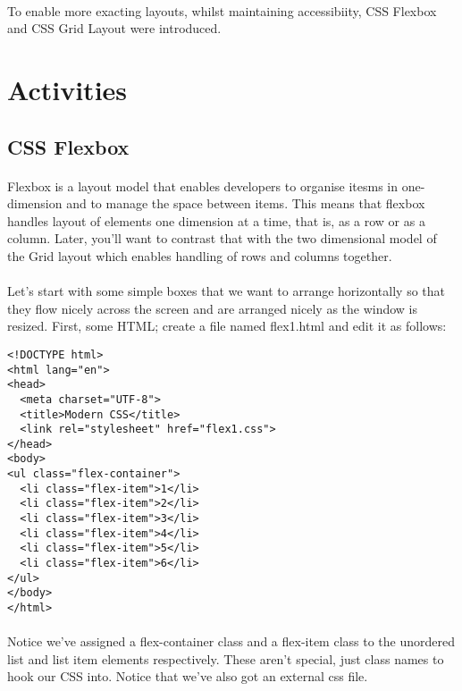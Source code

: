 \documentclass[10pt, a4paper]{article}
\begin{document}
\paragraph{} To enable more exacting layouts, whilst maintaining accessibiity, CSS Flexbox and CSS Grid Layout were introduced. 

\section*{Activities}

\subsection*{CSS Flexbox}
\paragraph{} Flexbox is a layout model that enables developers to organise itesms in one-dimension and to manage the space between items. This means that flexbox handles layout of elements one dimension at a time, that is, as a row or as a column. Later, you'll want to contrast that with the two dimensional model of the Grid layout which enables handling of rows and columns together.

\paragraph{} Let's start with some simple boxes that we want to arrange horizontally so that they flow nicely across the screen and are arranged nicely as the window is resized. First, some HTML; create a file named flex1.html and edit it as follows:

\begin{lstlisting}
<!DOCTYPE html>
<html lang="en">
<head>
  <meta charset="UTF-8">
  <title>Modern CSS</title>
  <link rel="stylesheet" href="flex1.css">
</head>
<body>
<ul class="flex-container">
  <li class="flex-item">1</li>
  <li class="flex-item">2</li>
  <li class="flex-item">3</li>
  <li class="flex-item">4</li>
  <li class="flex-item">5</li>
  <li class="flex-item">6</li>
</ul>
</body>
</html>
\end{lstlisting}
\paragraph{} Notice we've assigned a flex-container class and a flex-item class to the unordered list and list item elements respectively. These aren't special, just class names to hook our CSS into. Notice that we've also got an external css file.
\end{document}

